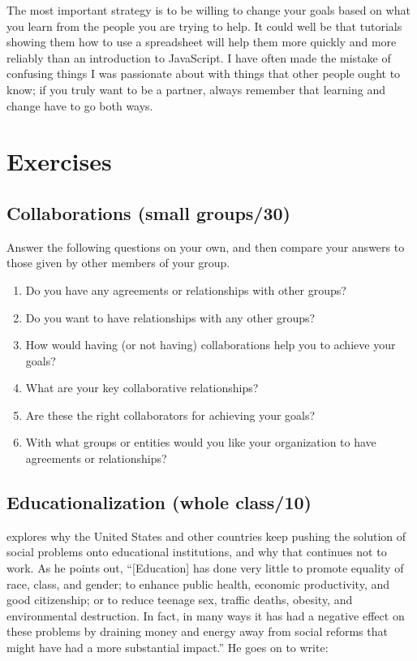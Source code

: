 The most important strategy is to be willing to change your goals based
on what you learn from the people you are trying to help. It could well
be that tutorials showing them how to use a spreadsheet will help them
more quickly and more reliably than an introduction to JavaScript. I
have often made the mistake of confusing things I was passionate about
with things that other people ought to know; if you truly want to be a
partner, always remember that learning and change have to go both ways.

\section{Exercises}\label{s:partner-exercises}

\subsection*{Collaborations (small groups/30)}

Answer the following questions on your own, and then compare your
answers to those given by other members of your group.

\begin{enumerate}
\item
  Do you have any agreements or relationships with other groups?
\item
  Do you want to have relationships with any other groups?
\item
  How would having (or not having) collaborations help you to achieve
  your goals?
\item
  What are your key collaborative relationships?
\item
  Are these the right collaborators for achieving your goals?
\item
  With what groups or entities would you like your organization to
  have agreements or relationships?
\end{enumerate}

\subsection*{Educationalization (whole class/10)}

\cite{Laba2008} explores why the United States and other countries
keep pushing the solution of social problems onto educational
institutions, and why that continues not to work. As he points out,
``{[}Education{]} has done very little to promote equality of race,
class, and gender; to enhance public health, economic productivity, and
good citizenship; or to reduce teenage sex, traffic deaths, obesity, and
environmental destruction. In fact, in many ways it has had a negative
effect on these problems by draining money and energy away from social
reforms that might have had a more substantial impact.'' He goes on to
write:

